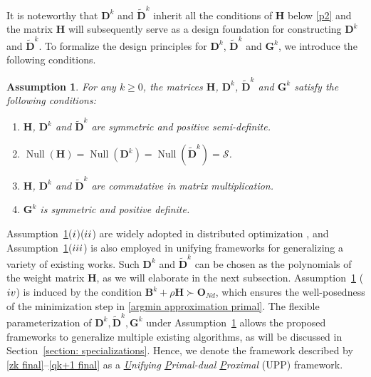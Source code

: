 \documentclass[12pt,draftcls,onecolumn]{IEEEtran}
\newcommand{\bB}{{\mathbf{B}}}
\newcommand{\bG}{{\mathbf{G}}}
\newcommand{\bH}{{\mathbf{H}}}
\newcommand{\bD}{{\mathbf{D}}}
\newtheorem{assumption}{Assumption}
\begin{document}
It is noteworthy that $\mathbf{D}^k$ and $\tilde{\bD}^k$ inherit all the conditions of $\bH$ below \eqref{p2} and the matrix $\bH$ will subsequently serve as a design foundation for constructing $\mathbf{D}^k$ and $\tilde{\bD}^k$. To formalize the design principles for $\mathbf{D}^k$, $\mathbf{\tilde{D}}^k$ and $\bG^k$, we introduce the following conditions.

\begin{assumption}\label{assumption: Dk}
For any $k\geq 0$, the matrices $\bH$, $\mathbf{D}^k$, $\tilde{\mathbf{D}}^k$ and $\bG^k$ satisfy the following conditions:
\begin{enumerate}
    \item[($\romannumeral1$)] $\bH$, $\mathbf{D}^k$ and $\tilde{\mathbf{D}}^k$ are symmetric and positive semi-definite.
    \item[($\romannumeral2$)] $\operatorname{Null}(\bH)=\operatorname{Null}(\bD^k)=\operatorname{Null}(\tilde{\bD}^k) = \mathcal{S}$.
    \item[($\romannumeral3$)] $\bH$, $\mathbf{D}^k$ and $\tilde{\mathbf{D}}^k$ are commutative in matrix multiplication.
    \item[($\romannumeral4$)] $\bG^k$ is symmetric and positive definite.
\end{enumerate}
\end{assumption}

Assumption~\ref{assumption: Dk}($\romannumeral1$)($\romannumeral2$) are widely adopted in distributed optimization \cite{shi_extra_2015,AugDGM2015,nedic_achieving_2017,xu_bregman_2018,mokhtari_dqm_2016,wu_second-order_2021,alghunaim_decentralized_2021,Wu2020AUA,hong2016convergence,hong_distributed_2018,mancino2023decentralized,yi2022sublinear,yi2021linear,alghunaim_unified_2022}, and Assumption~\ref{assumption: Dk}($\romannumeral3$) is also employed in unifying frameworks \cite{alghunaim_unified_2022,xu_distributed_2021} for generalizing a variety of existing works. Such $\bD^k$ and $\tilde{\bD}^k$ can be chosen as the polynomials of the weight matrix $\bH$, as we will elaborate in the next subsection. Assumption~\ref{assumption: Dk} ($\romannumeral4$) is induced by the condition $\bB^k+\rho\bH\succ\mathbf{O}_{Nd}$, which ensures the well-posedness of the minimization step in \eqref{argmin approximation primal}. The flexible parameterization of $\bD^k,\tilde{\bD}^k,\bG^k$ under Assumption~\ref{assumption: Dk} allows the proposed frameworks to generalize multiple existing algorithms, as will be discussed in Section~\ref{section: specializations}. Hence, we denote the framework described by \eqref{zk final}--\eqref{qk+1 final} as a \emph{\underline{U}nifying \underline{P}rimal-dual \underline{P}roximal} (UPP) framework.
\end{document}

